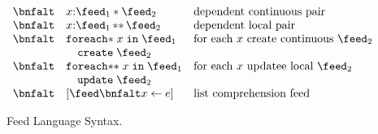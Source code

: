 \begin{figure}[t]
\[\begin{array}{lll}
 \bnfalt & x{:}\feed_1 * \feed_2 & \mbox{dependent continuous pair} \\
 \bnfalt & x{:}\feed_1\, {*}{*} \, \feed_2 & \mbox{dependent local pair} \\
 \bnfalt &     \mathtt{foreach{*}}\; x \; 
    \mathtt{in}\; \feed_1 & \mbox{for each $x$ create continuous $\feed_2$} \\
 &   \quad \mathtt{create}\; \feed_2 \\
 \bnfalt &     \mathtt{foreach{*}{*}}\; x \; 
    \mathtt{in}\; \feed_1 & \mbox{for each $x$ updatee local $\feed_2$}\\
 &   \quad \mathtt{update}\; \feed_2 \\
 \bnfalt & [\feed \bnfalt x \leftarrow e ] & \mbox{list comprehension feed} \\
\end{array}
\]
\caption{Feed Language Syntax.}
\label{fig:syntax}
\end{figure}


